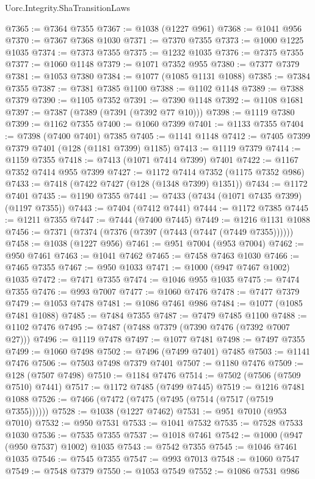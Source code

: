\begin{lexlean}{Uorc.Integrity.ShaTransitionLaws}
\begin{coremodule}
@7365 := @7364 @7355
@7367 := @1038 (@1227 @961)
@7368 := @1041 @956
@7370 := @7367 @7368 @1030
@7371 := @7370 @7355
@7373 := @1000 @1225 @1035
@7374 := @7373 @7355
@7375 := @1232 @1035
@7376 := @7375 @7355
@7377 := @1060 @1148
@7379 := @1071 @7352 @955
@7380 := @7377 @7379
@7381 := @1053 @7380
@7384 := @1077 (@1085 @1131 @1088)
@7385 := @7384 @7355
@7387 := @7381 @7385 @1100
@7388 := @1102 @1148
@7389 := @7388 @7379
@7390 := @1105 @7352
@7391 := @7390 @1148
@7392 := @1108 @1681
@7397 := @7387 (@7389 (@7391 (@7392 @77 @10)))
@7398 := @1119 @7380
@7399 := @1162 @7355
@7400 := @1060 @7399
@7401 := @1133 @7355
@7404 := @7398 (@7400 @7401) @7385
@7405 := @1141 @1148
@7412 := @7405 @7399 @7379 @7401 (@128 (@1181 @7399) @1185)
@7413 := @1119 @7379
@7414 := @1159 @7355
@7418 := @7413 (@1071 @7414 @7399) @7401
@7422 := @1167 @7352 @7414 @955 @7399
@7427 := @1172 @7414 @7352 (@1175 @7352 @986)
@7433 := @7418 (@7422 @7427 (@128 (@1348 @7399) @1351))
@7434 := @1172 @7401
@7435 := @1190 @7355
@7441 := @7433 (@7434 (@1071 @7435 @7399) (@1197 @7355))
@7443 := @7404 (@7412 @7441)
@7444 := @1172 @7385
@7445 := @1211 @7355
@7447 := @7444 (@7400 @7445)
@7449 := @1216 @1131 @1088
@7456 := @7371 (@7374 (@7376 (@7397 (@7443 (@7447 (@7449 @7355))))))
@7458 := @1038 (@1227 @956)
@7461 := @951 @7004 (@953 @7004)
@7462 := @950 @7461
@7463 := @1041 @7462
@7465 := @7458 @7463 @1030
@7466 := @7465 @7355
@7467 := @950 @1033
@7471 := @1000 (@947 @7467 @1002) @1035
@7472 := @7471 @7355
@7474 := @1046 @955 @1035
@7475 := @7474 @7355
@7476 := @993 @7007
@7477 := @1060 @7476
@7478 := @7477 @7379
@7479 := @1053 @7478
@7481 := @1086 @7461 @986
@7484 := @1077 (@1085 @7481 @1088)
@7485 := @7484 @7355
@7487 := @7479 @7485 @1100
@7488 := @1102 @7476
@7495 := @7487 (@7488 @7379 (@7390 @7476 (@7392 @7007 @27)))
@7496 := @1119 @7478
@7497 := @1077 @7481
@7498 := @7497 @7355
@7499 := @1060 @7498
@7502 := @7496 (@7499 @7401) @7485
@7503 := @1141 @7476
@7506 := @7503 @7498 @7379 @7401
@7507 := @1180 @7476
@7509 := @128 (@7507 @7498)
@7510 := @1184 @7476
@7514 := @7502 (@7506 (@7509 @7510) @7441)
@7517 := @1172 @7485 (@7499 @7445)
@7519 := @1216 @7481 @1088
@7526 := @7466 (@7472 (@7475 (@7495 (@7514 (@7517 (@7519 @7355))))))
@7528 := @1038 (@1227 @7462)
@7531 := @951 @7010 (@953 @7010)
@7532 := @950 @7531
@7533 := @1041 @7532
@7535 := @7528 @7533 @1030
@7536 := @7535 @7355
@7537 := @1018 @7461
@7542 := @1000 (@947 (@950 @7537) @1002) @1035
@7543 := @7542 @7355
@7545 := @1046 @7461 @1035
@7546 := @7545 @7355
@7547 := @993 @7013
@7548 := @1060 @7547
@7549 := @7548 @7379
@7550 := @1053 @7549
@7552 := @1086 @7531 @986

\end{coremodule}
\end{lexlean}

